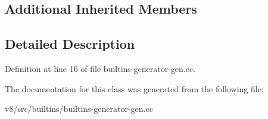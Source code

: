 \subsection*{Additional Inherited Members}


\subsection{Detailed Description}


Definition at line 16 of file builtins-\/generator-\/gen.\+cc.



The documentation for this class was generated from the following file\+:\begin{DoxyCompactItemize}
\item 
v8/src/builtins/builtins-\/generator-\/gen.\+cc\end{DoxyCompactItemize}
